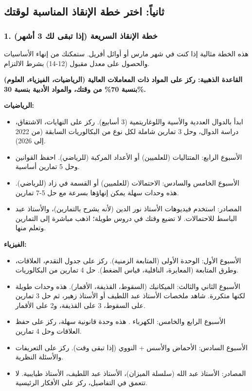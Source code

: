 \documentclass[12pt,a4paper]{book}
\newcommand{\importantAr}[1]{%
	\begin{important}
		\bfseries #1
	\end{important}
}
\begin{document}
	\subsection{ثانياً: اختر خطة الإنقاذ المناسبة لوقتك}
	
	\subsubsection*{1. خطة الإنقاذ السريعة (إذا تبقى لك 3 أشهر)}
	هذه الخطة مثالية إذا كنت في شهر مارس أو أوائل أفريل. ستمكنك من إنهاء الأساسيات والحصول على معدل مقبول (12-14) بشرط الالتزام.
	
	\importantAr{القاعدة الذهبية: ركز على المواد ذات المعاملات العالية (الرياضيات، الفيزياء، العلوم) بنسبة 70\% من وقتك، والمواد الأدبية بنسبة 30\%.}
	
	\textbf{الرياضيات:}
	\begin{itemize}
		\item ابدأ بالدوال العددية والأسية واللوغاريتمية (3 أسابيع). ركز على النهايات، الاشتقاق، دراسة الدوال، وحل 3 تمارين شاملة لكل نوع من البكالوريات السابقة (من 2022 إلى 2026).
		\item الأسبوع الرابع: المتتاليات (للعلميين) أو الأعداد المركبة (للرياضي). احفظ القوانين وحل 5 تمارين أساسية.
		\item الأسبوع الخامس والسادس: الاحتمالات (للعلميين) أو القسمة في زاد (للرياضي). هذه وحدات سهلة يمكن إنهاؤها بسرعة مع حل 5-7 تمارين.
		\item المصادر: استخدم فيديوهات الأستاذ نور الدين (لأنه يشرح بالتمارين)، والأستاذ عبد الباسط للاحتمالات. لا تضيع وقتك في دروس طويلة؛ اذهب مباشرة إلى التمارين وتعلم منها.
	\end{itemize}
	
	\textbf{الفيزياء:}
	\begin{itemize}
		\item الأسبوع الأول: الوحدة الأولى (المتابعة الزمنية). ركز على جدول التقدم، العلاقات، وطرق المتابعة (المعايرة، الناقلية، قياس الضغط). حل 4 تمارين من البكالوريات.
		\item الأسبوع الثاني والثالث: الميكانيك (السقوط، القذيفة، الأقمار). هذه وحدات طويلة لكنها متكررة. شاهد ملخصات الأستاذ عبد اللطيف أو الأستاذ زهير، ثم حل 3 تمارين على السقوط، 3 على القذيفة، و2 على الأقمار.
		\item الأسبوع الرابع والخامس: الكهرباء . هذه وحدة قانونية سهلة، ركز على حفظ العلاقات وحل 4 تمارين.
		\item الأسبوع السادس: الأحماض والأسس + النووي (إذا تبقى وقت). ركز على التعريفات والأسئلة النظرية.
		\item المصادر: الأستاذ عبد الله (سلسلة الميزان)، الأستاذ عبد اللطيف، الأستاذ طيايبية. لا تتعمق في التفاصيل، ركز على الأفكار الرئيسية.
	\end{itemize}
	
\end{document}
